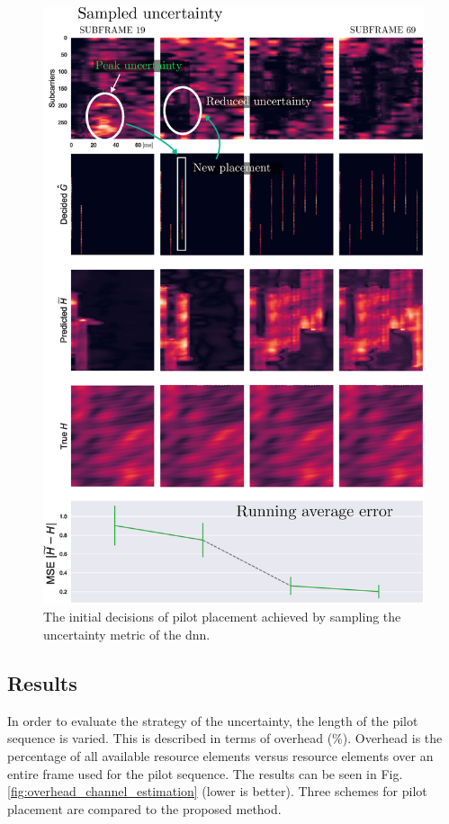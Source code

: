 \begin{figure}
    \centering
    \includegraphics{chapters/part_uplink/figures/results/channel_estimation/decision_example_imshow.eps}
    \caption{The initial decisions of pilot placement achieved by sampling the uncertainty metric of the \gls{dnn}.}
    \label{fig:decision_example}
\end{figure}

\subsection{Results}
In order to evaluate the strategy of the uncertainty, the length of the pilot sequence is varied. This is described in terms of overhead (\%). Overhead is the percentage of all available resource elements versus resource elements over an entire frame used for the pilot sequence. The results can be seen in Fig. \ref{fig:overhead_channel_estimation} (lower is better). Three schemes for pilot placement are compared to the proposed method. 

